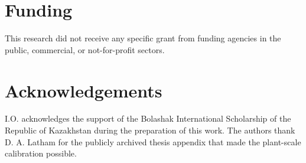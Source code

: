 \section*{Funding}

This research did not receive any specific grant from funding agencies in the public, commercial, or not-for-profit sectors.

\section*{Acknowledgements}

I.O. acknowledges the support of the Bolashak International Scholarship of the Republic of Kazakhstan during the preparation of
this work. The authors thank D. A. Latham for the publicly archived thesis appendix that made the plant-scale calibration
possible.

